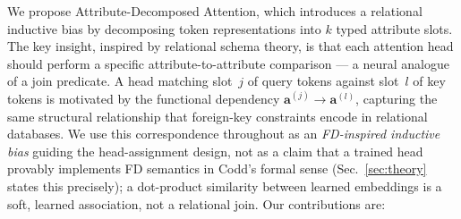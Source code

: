 \documentclass[review]{elsarticle}
\begin{document}
We propose {Attribute-Decomposed Attention}, which introduces a relational inductive bias by decomposing token representations into $k$ typed attribute slots. The key insight, inspired by relational schema theory, is that each attention head should perform a specific attribute-to-attribute comparison --- a neural analogue of a join predicate. A head matching slot~$j$ of query tokens against slot~$l$ of key tokens is motivated by the functional dependency $\mathbf{a}^{(j)} \to \mathbf{a}^{(l)}$, capturing the same structural relationship that foreign-key constraints encode in relational databases. We use this correspondence throughout as an \emph{FD-inspired inductive bias} guiding the head-assignment design, not as a claim that a trained head provably implements FD semantics in Codd's formal sense (Sec.~\ref{sec:theory} states this precisely); a dot-product similarity between learned embeddings is a soft, learned association, not a relational join.
Our contributions are:
\end{document}

